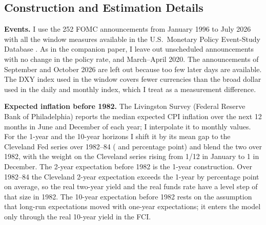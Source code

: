 \documentclass[11pt]{article}
\begin{document}
\begin{appendices}

\FloatBarrier

\FloatBarrier

\FloatBarrier

\FloatBarrier

\FloatBarrier

\FloatBarrier

\FloatBarrier

\FloatBarrier

\FloatBarrier

\FloatBarrier


\FloatBarrier

\FloatBarrier

\FloatBarrier
\section{Construction and Estimation Details}\label{app:details}
\textbf{Events.} I use the 252 FOMC announcements from January 1996 to July 2026 with all the window measures available in the U.S.\ Monetary Policy Event-Study Database \citep{acosta2025}. As in the companion paper, I leave out unscheduled announcements with no change in the policy rate, and March--April 2020. The announcements of September and October 2026 are left out because too few later days are available. The DXY index used in the window covers fewer currencies than the broad dollar used in the daily and monthly index, which I treat as a measurement difference.

\textbf{Expected inflation before 1982.} The Livingston Survey (Federal Reserve Bank of Philadelphia) reports the median expected CPI inflation over the next 12 months in June and December of each year; I interpolate it to monthly values. For the 1-year and the 10-year horizons I shift it by its mean gap to the Cleveland Fed series over 1982--84 ( and  percentage point) and blend the two over 1982, with the weight on the Cleveland series rising from 1/12 in January to 1 in December. The 2-year expectation before 1982 is the 1-year construction. Over 1982--84 the Cleveland 2-year expectation exceeds the 1-year by  percentage point on average, so the real two-year yield and the real funds rate have a level step of that size in 1982. The 10-year expectation before 1982 rests on the assumption that long-run expectations moved with one-year expectations; it enters the model only through the real 10-year yield in the FCI.


\end{appendices}
\end{document}
